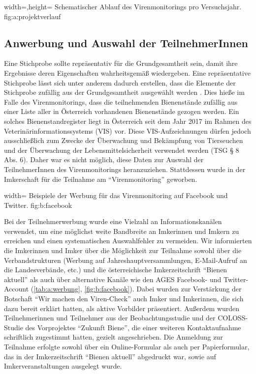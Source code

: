 {width=\textwidth,height=\textheight}
{Schematischer Ablauf des Virenmonitorings pro Versuchsjahr.}%
{}%
{fig:a:projektverlauf}%


\subsection{Anwerbung und Auswahl der TeilnehmerInnen}\label{chap:werbung}

Eine Stichprobe sollte repräsentativ für die Grundgesamtheit sein, damit ihre Ergebnisse deren Eigenschaften wahrheitsgemäß wiedergeben. Eine repräsentative Stichprobe lässt sich unter anderem dadurch erstellen, dass die Elemente der Stichprobe zufällig aus der Grundgesamtheit ausgewählt werden \citep{vanderzee2013}. Dies hieße im Falle des Virenmonitorings, dass die teilnehmenden Bienenstände zufällig aus einer Liste aller in Österreich vorhandenen Bienenstände gezogen werden. Ein solches Bienenstandregister liegt in Österreich seit dem Jahr 2017 im Rahmen des Veterinärinformationssystems (VIS) vor. Diese VIS-Aufzeichnungen dürfen jedoch ausschließlich zum Zwecke der Überwachung und Bekämpfung von Tierseuchen und der Überwachung der Lebensmittelsicherheit verwendet werden (TSG § 8 Abs. 6). Daher war es nicht möglich, diese Daten zur Auswahl der TeilnehmerInnen des Virenmonitorings heranzuziehen. Stattdessen wurde in der Imkerschaft für die Teilnahme am \enquote{Virenmonitoring} geworben. 

  {width=\textwidth} %
  {Beispiele der Werbung für das Virenmonitoring auf Facebook und Twitter.} %
  {} %
  {fig:b:facebook} %

Bei der Teilnehmerwerbung wurde eine Vielzahl an Informationskanälen verwendet, um eine möglichst weite Bandbreite an Imkerinnen und Imkern zu erreichen und einen systematischen Auswahlfehler zu vermeiden. Wir informierten die Imkerinnen und Imker über die Möglichkeit zur Teilnahme sowohl über die Verbandstrukturen (Werbung auf Jahreshauptversammlungen, E-Mail-Aufruf an die Landesverbände, etc.) und die österreichische Imkerzeitschrift \enquote{Bienen aktuell} als auch über alternative Kanäle wie den AGES Facebook- und Twitter-Account (\cref{tab:a:werbung}, \cref{fig:b:facebook}). Dabei wurden zur Verstärkung der Botschaft \enquote{Wir machen den Viren-Check} auch Imker und Imkerinnen, die sich dazu bereit erklärt hatten, als aktive Vorbilder präsentiert.
Außerdem wurden Teilnehmerinnen und Teilnehmer aus der Beobachtungsstudie und der COLOSS-Studie des Vorprojektes \enquote{Zukunft Biene}, die einer weiteren Kontaktaufnahme schriftlich zugestimmt hatten, gezielt angeschrieben. Die Anmeldung zur Teilnahme erfolgte sowohl über ein Online-Formular als auch per Papierformular, das in der Imkerzeitschrift \enquote{Bienen aktuell} abgedruckt war, sowie auf Imkerveranstaltungen ausgelegt wurde.

